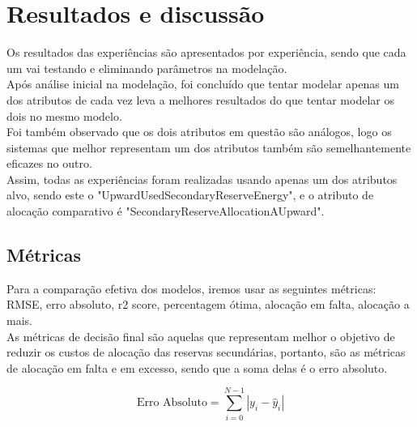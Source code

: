 \chapter{Resultados e discussão}

Os resultados das experiências são apresentados por experiência, sendo que cada um vai testando e eliminando parâmetros na modelação.\\
Após análise inicial na modelação, foi concluído que tentar modelar apenas um dos atributos de cada vez leva a melhores resultados do que tentar modelar os dois no mesmo modelo.\\
Foi também observado que os dois atributos em questão são análogos, logo os sistemas que melhor representam um dos atributos também são semelhantemente eficazes no outro. \\
Assim, todas as experiências foram realizadas usando apenas um dos atributos alvo, sendo este o "UpwardUsedSecondaryReserveEnergy", e o atributo de alocação comparativo é "SecondaryReserveAllocationAUpward".\\

\section{Métricas\label{se:metricas}}

Para a comparação efetiva dos modelos, iremos usar as seguintes métricas: RMSE, erro absoluto, r2 score, percentagem ótima, alocação em falta, alocação a mais.\\
As métricas de decisão final são aquelas que representam melhor o objetivo de reduzir os custos de alocação das reservas secundárias, portanto, são as métricas de alocação em falta e em excesso, sendo que a soma delas é o erro absoluto.\\

\begin{equation}
\label{eq:rmse}
\end{equation}

\begin{equation} \label{eq:abse} 
    \text{Erro Absoluto} = \sum_{i=0}^{N - 1} \left| y_i - \hat{y}_i \right| 
\end{equation}



